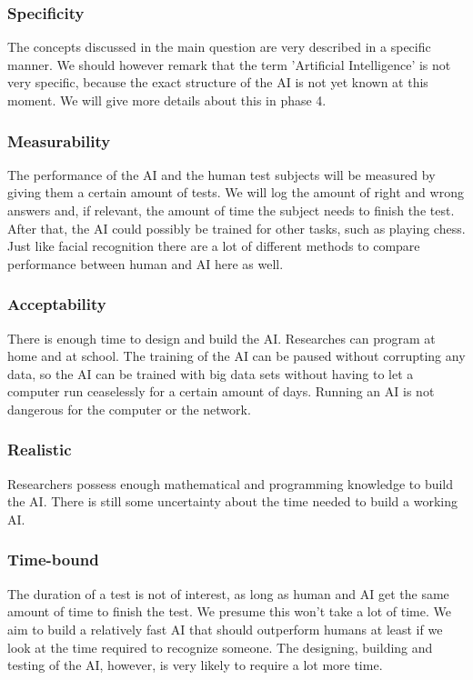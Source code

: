 \documentclass[12pt, titlepage]{article}
\begin{document}
    \subsubsection{Specificity}
    The concepts discussed in the main question are very described in a specific manner. We should however remark that the term 'Artificial Intelligence' is not very specific, because the exact structure of the AI is not yet known at this moment. We will give more details about this in phase 4.
    \subsubsection{Measurability}
    The performance of the AI and the human test subjects will be measured by giving them a certain amount of tests. We will log the amount of right and wrong answers and, if relevant, the amount of time the subject needs to finish the test. After that, the AI could possibly be trained for other tasks, such as playing chess. Just like facial recognition there are a lot of different methods to compare performance between human and AI here as well.
    \subsubsection{Acceptability}
    There is enough time to design and build the AI. Researches can program at home and at school. The training of the AI can be paused without corrupting any data, so the AI can be trained with big data sets without having to let a computer run ceaselessly for a certain amount of days. Running an AI is not dangerous for the computer or the network.
    \subsubsection{Realistic}
    Researchers possess enough mathematical and programming knowledge to build the AI. There is still some uncertainty about the time needed to build a working AI.
    \subsubsection{Time-bound}
    The duration of a test is not of interest, as long as human and AI get the same amount of time to finish the test. We presume this won't take a lot of time. We aim to build a relatively fast AI that should outperform humans at least if we look at the time required to recognize someone. The designing, building and testing of the AI, however, is very likely to require a lot more time.  
   
\end{document}
